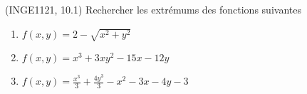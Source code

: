 
\begin{exercice}\label{exoFoncDeuxVar0029}

	(INGE1121, 10.1) Rechercher les extrémums des fonctions suivantes
	\begin{enumerate}

		\item
			$f(x,y)=2-\sqrt{x^2+y^2}$
		\item
			$f(x,y)=x^3+3xy^2-15x-12y$
		\item
			$f(x,y)=\frac{ x^3 }{ 3 }+\frac{ 4y^3 }{ 3 }-x^2-3x-4y-3$

	\end{enumerate}

\end{exercice}

